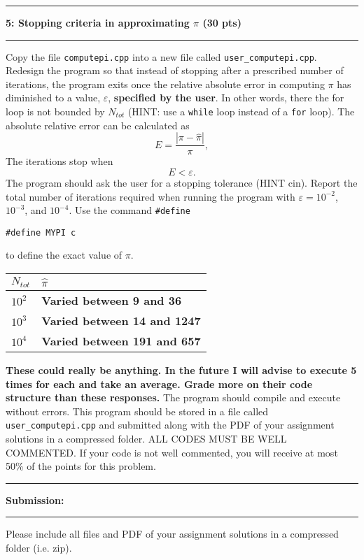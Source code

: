 \documentclass[11pt]{article}
\newcommand\question[2]{\vspace{.25in}\hrule\textbf{#1: #2}\vspace{.5em}\hrule\vspace{.10in}}
\begin{document}
\newpage
\question{5}{Stopping criteria in approximating $\pi$ (30 pts)}
Copy the file \texttt{computepi.cpp} into a new file called
\texttt{user\_computepi.cpp}. Redesign the program so that instead of stopping
after a prescribed number of iterations, the program exits once the relative
absolute error in computing $\pi$ has diminished to a value, $\varepsilon$,
\textbf{specified by the user}. In other words, there the for loop is not bounded by $N_{tot}$
(HINT: use a \texttt{while} loop instead of a \texttt{for} loop). The absolute relative error can be calculated as
\begin{equation*}
    E = \frac{|\pi - \hat{\pi}|}{\pi},
\end{equation*}
The iterations stop when
\begin{equation*}
    E < \varepsilon.
\end{equation*}
The program should ask the user for a stopping tolerance (HINT cin). Report the total
number of iterations required when running the program with $\varepsilon =  10^{-2}$,
$10^{-3}$, and $10^{-4}$. Use the command \texttt{\#define} \\
\begin{center}
    \texttt{\#define MYPI c}
\end{center}
to define the exact value of $\pi$. \\[1cm]

\begin{table}[H]
	\center
	\begin{tabular}{|l|l|}
		\hline
		$N_{tot}$ & \quad \text{ } $\hat{\pi}$ \\ \hline
		$10^2$    & \textbf{Varied between 9 and 36} \\ \hline
		$10^{3}$  & \textbf{Varied between 14 and 1247} \\ \hline
		$10^{4}$  & \textbf{Varied between 191 and 657} \\ \hline
	\end{tabular}
\end{table}
\textbf{These could really be anything. In the future I will advise to execute 5 times for each and take an average. Grade more on their code structure than these responses.}
\vspace{5pt}
The program should compile and execute without errors. This program
should be stored in a file called \texttt{user\_computepi.cpp} and submitted along with the PDF of your assignment solutions in a compressed folder. ALL CODES MUST BE WELL COMMENTED. If your code is not well commented, you will receive at most 50\% of the points for this problem.

\question{Submission}{}
Please include all files and PDF of your assignment solutions in a compressed folder (i.e. zip).
\end{document}
